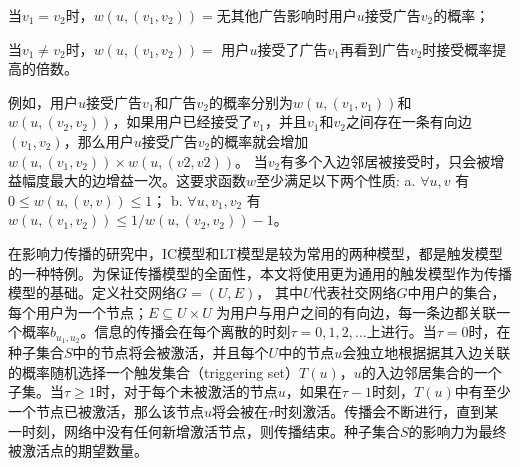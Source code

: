 当$v_1=v_2$时，$w(u,(v_1,v_2))=$无其他广告影响时用户$u$接受广告$v_2$的概率；

当$v_1\ne v_2$时，$w(u,(v_1,v_2))=$ 用户$u$接受了广告$v_1$再看到广告$v_2$时接受概率提高的倍数。


例如，用户$u$接受广告$v_1$和广告$v_2$的概率分别为$w(u,(v_1,v_1))$和$w(u,(v_2,v_2))$，如果用户已经接受了$v_1$，并且$v_1$和$v_2$之间存在一条有向边$(v_1,v_2)$，那么用户$u$接受广告$v_2$的概率就会增加$w(u,(v_1,v_2)) \times w(u,(v2,v2))$。 当$v_2$有多个入边邻居被接受时，只会被增益幅度最大的边增益一次。这要求函数$w$至少满足以下两个性质:
a. $ \forall u,v$ 有 $0\le w(u,(v,v))\le 1 $；
b. $\forall u,v_1,v_2$ 有$w(u,(v_1,v_2))\le 1/w(u,(v_2,v_2))-1$。

在影响力传播的研究中，IC模型和LT模型是较为常用的两种模型，都是触发模型的一种特例\cite{kempe2003maximizing}。为保证传播模型的全面性，本文将使用更为通用的触发模型作为传播模型的基础。定义社交网络$G=(U,E)$， 其中$U$代表社交网络$G$中用户的集合，每个用户为一个节点；$E\subseteq U\times U$ 为用户与用户之间的有向边，每一条边都关联一个概率$b_{u_1,u_2}$。信息的传播会在每个离散的时刻$\tau =0,1,2, ...$上进行。当$\tau = 0$时，在种子集合$S$中的节点将会被激活，并且每个$U$中的节点$u$会独立地根据据其入边关联的概率随机选择一个触发集合（triggering set）$T(u)$，$u$的入边邻居集合的一个子集。当$\tau \ge 1$时，对于每个未被激活的节点$u$，如果在$\tau -1$时刻，$T(u)$中有至少一个节点已被激活，那么该节点$u$将会被在$\tau$时刻激活。传播会不断进行，直到某一时刻，网络中没有任何新增激活节点，则传播结束。种子集合$S$的影响力为最终被激活点的期望数量。

